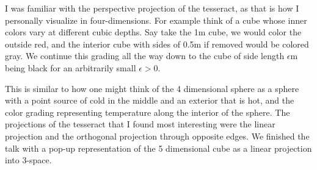 \documentclass[12pt]{amsart}
\theoremstyle{conjecture}
\theoremstyle{definition}
\theoremstyle{question}
\theoremstyle{theorem}
\begin{document}
\begin{onehalfspace}
        I was familiar with the perspective projection of the tesseract, as that is how I personally visualize
        in four-dimensions.
        For example think of a cube whose inner colors vary at different cubic depths.
        Say take the 1m cube, we would color the outside red, and the interior cube  with sides of 0.5m if removed
        would be colored gray.
        We continue this grading all the way down to the cube of side length $\epsilon$m being black for an arbitrarily
        small $\epsilon > 0$.

        This is similar to how one might think of the 4 dimensional sphere as a sphere with a point source of cold in
        the middle and an exterior that is hot, and the color grading representing temperature along the interior of
        the sphere.
        The projections of the tesseract that I found most interesting were the linear projection and the orthogonal
        projection through opposite edges.
        We finished the talk with a pop-up representation of the 5 dimensional cube as a linear projection into
        3-space.
    \end{onehalfspace}
\end{document}
